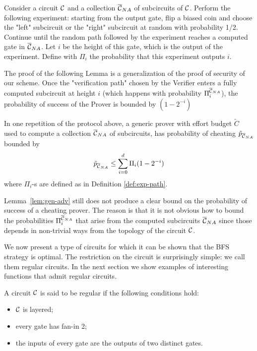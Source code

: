 \begin{mydef}
	\label{def:exp-path}
	Consider a circuit $\cal C$ and a collection $\overline{\cal{C}}_{NA}$ of subcircuits of $\cal C$. Perform the following experiment: starting from the output gate, flip a biased coin and choose the "left" subcircuit or the "right" subcircuit at random with probability 1/2. Continue until the random path followed by the experiment reaches a computed gate in $\overline{\cal{C}}_{NA}$. Let $i$ be the height of this gate, which is the output of the experiment. Define with $\Pi_i$ the probability that this experiment outputs $i$.
\end{mydef}

The proof of the following Lemma is a generalization of the proof of security of our scheme. Once the "verification path" chosen by the Verifier enters a fully computed subcircuit at height $i$ (which happens with probability $\Pi_i^{\overline{\cal{C}}_{NA}}$), the probability of success of the Prover is bounded by $(1 - 2^{-i})$

\begin{lemma}
\label{lem:gen-adv}
	In one repetition of the protocol above, a generic prover with effort budget $\tilde{C}$ used to compute a collection $\overline{\cal{C}}_{NA}$ of subcircuits, has probability of cheating $\tilde{p}_{\overline{\cal{C}}_{NA}}$ bounded by
	$$ \tilde{p}_{\overline{\cal{C}}_{NA}} \leq \sum_{i=0}^{d} \Pi_i (1 - 2^{-i})$$
	where $\Pi_i$-s are defined as in Definition \ref{def:exp-path}.
\end{lemma}



\smallskip
\noindent
Lemma~\ref{lem:gen-adv} still does not produce a clear bound on the probability of success of a cheating prover. The reason is that it is not obvious
how to bound the probabilities $\Pi_i^{\overline{\cal{C}}_{NA}}$ that arise from the computed subcircuits $\overline{\cal{C}}_{NA}$ since those depends in non-trivial ways from the 
topology of the circuit $\cal C$. 

We now present a type of circuits for which it can be shown that the BFS strategy is optimal. The restriction on the circuit is surprisingly simple: we call them 
{\sf regular circuits}. In 
the next section we show examples of interesting functions that admit regular circuits. 

\begin{mydef}
\label{def:reg-circ}
	A circuit $\cal C$ is said to be regular if the following conditions hold:
	\begin{itemize}
		\item $\cal C$ is layered;
		\item every gate has fan-in 2;
		\item the inputs of every gate are the outputs of two distinct gates.
	\end{itemize}
\end{mydef}

